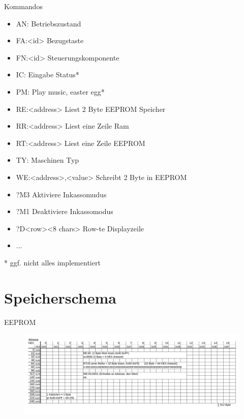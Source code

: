 \documentclass[
  de, %
  inputenc=utf8,
]{tuhhslides}
\begin{document}
\begin{frame}{Kommandos}
	\begin{itemize}
    \item AN: Betriebszustand
    \item FA:<id> Bezugstaste
    \item FN:<id> Steuerungskomponente
    \item IC: Eingabe Status*
    \item PM: Play music, easter egg*
    \item RE:<address> Liest 2 Byte EEPROM Speicher
	  \item \alert<2>{RR:<address> Liest eine Zeile Ram}
	  \item \alert<2>{RT:<address> Liest eine Zeile EEPROM}
    \item TY: Maschinen Typ
    \item WE:<address>,<value> Schreibt 2 Byte in EEPROM
    \item ?M3 Aktiviere Inkassomudus
    \item ?M1 Deaktiviere Inkassomodus
    \item ?D<row><8 chars> Row-te Displayzeile
    \item ...
	\end{itemize}
	* ggf. nicht alles implementiert
\end{frame}



\section{Speicherschema}
\begin{frame}{EEPROM}
  \begin{figure}
    \begin{center}
      \hspace*{-1cm}
      \includegraphics[scale=0.46]{Material/Speicher-Schema-Jura-EEPROM}
    \end{center}
  \end{figure}
\end{frame}
\end{document}
